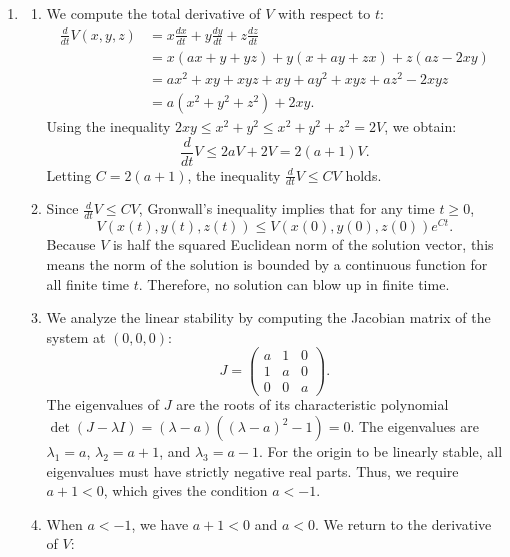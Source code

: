 \documentclass{article}
\begin{document}
\begin{enumerate}[label=\fbox{\arabic*}]
  \item %
        \begin{enumerate}[label=(\arabic*)]
          \item We compute the total derivative of $V$ with respect to $t$:
                \begin{align*}
                  \frac{d}{dt} V(x, y, z) & = x \frac{dx}{dt} + y \frac{dy}{dt} + z \frac{dz}{dt} \\
                                          & = x(ax + y + yz) + y(x + ay + zx) + z(az - 2xy)       \\
                                          & = ax^2 + xy + xyz + xy + ay^2 + xyz + az^2 - 2xyz     \\
                                          & = a(x^2 + y^2 + z^2) + 2xy.
                \end{align*}
                Using the inequality $2xy \le x^2 + y^2 \le x^2 + y^2 + z^2 = 2V$, we obtain:
                \[
                  \frac{d}{dt} V \le 2aV + 2V = 2(a+1)V.
                \]
                Letting $C = 2(a+1)$, the inequality $\frac{d}{dt} V \le CV$ holds.
          \item Since $\frac{d}{dt} V \le CV$, Gronwall's inequality implies that for any time $t \ge 0$,
                \[
                  V(x(t), y(t), z(t)) \le V(x(0), y(0), z(0)) e^{Ct}.
                \]
                Because $V$ is half the squared Euclidean norm of the solution vector, this means the norm of the solution is bounded by a continuous function for all finite time $t$. Therefore, no solution can blow up in finite time.
          \item We analyze the linear stability by computing the Jacobian matrix of the system at $(0, 0, 0)$:
                \[
                  J = \begin{pmatrix} a & 1 & 0 \\ 1 & a & 0 \\ 0 & 0 & a \end{pmatrix}.
                \]
                The eigenvalues of $J$ are the roots of its characteristic polynomial $\det(J - \lambda I) = (\lambda - a)((\lambda - a)^2 - 1) = 0$.
                The eigenvalues are $\lambda_1 = a$, $\lambda_2 = a+1$, and $\lambda_3 = a-1$.
                For the origin to be linearly stable, all eigenvalues must have strictly negative real parts. Thus, we require $a+1 < 0$, which gives the condition $a < -1$.
          \item When $a < -1$, we have $a+1 < 0$ and $a < 0$. We return to the derivative of $V$:

\end{enumerate}
\end{enumerate}
\end{document}
